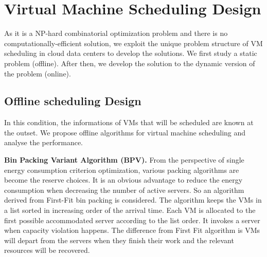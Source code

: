 \documentclass[10pt,journal]{IEEEtran}
\begin{document}
\section{Virtual Machine Scheduling Design}
\label{sec:algorithm}

As it is a NP-hard combinatorial optimization problem and there is no computationally-efficient solution, we exploit the unique problem structure of VM scheduling in cloud data centers to develop the solutions. We first study a static problem (offline). After then, we develop the solution to the dynamic version of the problem (online).

\subsection{Offline scheduling Design}
In this condition, the informations of VMs that will be scheduled are known at the outset. We propose offline algorithms for virtual machine scheduling and analyse the performance.

\textbf{Bin Packing Variant Algorithm (BPV).} From the perspective of single energy consumption criterion optimization, various packing algorithms are become the reserve choices. It is an obvious advantage to reduce the energy consumption when decreasing the number of active servers. So an algorithm derived from First-Fit bin packing is considered. The algorithm keeps the VMs in a list sorted in increasing order of the arrival time. Each VM is allocated to the first possible accommodated server according to the list order. It invokes a server when capacity violation happens. The difference from First Fit algorithm is VMs will depart from the servers when they finish their work and the relevant resources will be recovered.
\end{document}

